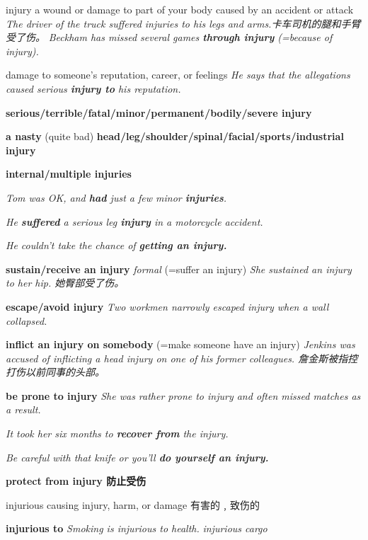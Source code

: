\begin{DefWord}{injury}
    a wound or damage to part of your body caused by an accident or attack
    \textit{The driver of the truck suffered injuries to his legs and arms.卡车司机的腿和手臂受了伤。}
    \textit{Beckham has missed several games \textbf{through injury} (=because of injury).}

    damage to someone's reputation, career, or feelings
    \textit{He says that the allegations caused serious \textbf{injury to} his reputation.}

    \textbf{serious/terrible/fatal/minor/permanent/bodily/severe injury}

    \textbf{a nasty} (quite bad) \textbf{head/leg/shoulder/spinal/facial/sports/industrial injury}

    \textbf{internal/multiple injuries}

    \textit{Tom was OK, and \textbf{had} just a few minor \textbf{injuries}.}

    \textit{He \textbf{suffered} a serious leg \textbf{injury} in a motorcycle accident.}

    \textit{He couldn't take the chance of \textbf{getting an injury.}}

    \textbf{sustain/receive an injury} \textit{formal} (=suffer an injury)
     \textit{She sustained an injury to her hip. 她臀部受了伤。}

    \textbf{escape/avoid injury}
    \textit{Two workmen narrowly escaped injury when a wall collapsed.}

    \textbf{inflict an injury on somebody}  (=make someone have an injury)
    \textit{Jenkins was accused of inflicting a head injury on one of his former colleagues. 詹金斯被指控打伤以前同事的头部。}

    \textbf{be prone to injury}
    \textit{She was rather prone to injury and often missed matches as a result.}

    \textit{ It took her six months to \textbf{recover from} the injury.}

    \textit{Be careful with that knife or you'll \textbf{do yourself an injury.}}

    \textbf{protect from injury 防止受伤}
\end{DefWord}

\begin{DefWord}{injurious}
    causing injury, harm, or damage 有害的﹐致伤的
    
    \textbf{injurious to}
    \textit{Smoking is injurious to health.}
    \textit{injurious cargo}
\end{DefWord}


